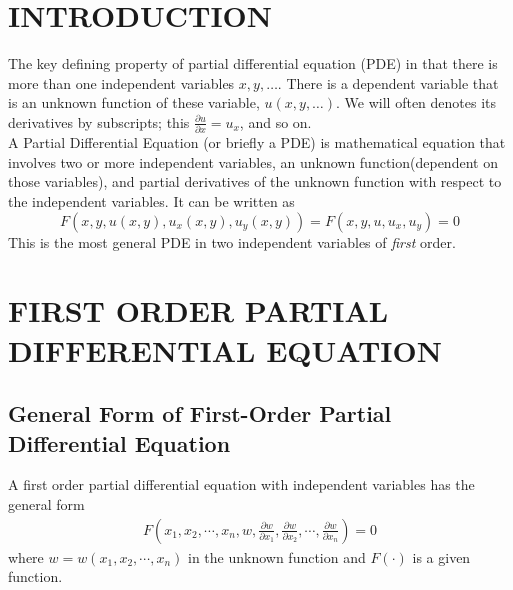 \documentclass[11pt]{report}
\newcommand{\dsp}{\displaystyle}
\begin{document}
	\section{INTRODUCTION}
	The key defining property of partial differential equation (PDE) in that there is more than one independent variables $x,y,\ldots$. There is a dependent variable that is an unknown function of these variable, $u(x,y,\ldots)$. We will often denotes its derivatives by subscripts; this $\dsp\frac{\partial u}{\partial x} = u_x$, and so on.\\
	
	A Partial Differential Equation (or briefly a PDE) is  mathematical equation that involves two or more independent variables, an unknown function(dependent on those variables), and partial derivatives of the unknown function with respect to the independent variables. It can be written as
	\begin{equation}
		F(x,y,u(x,y), u_x(x,y), u_y(x,y)) = F(x,y,u,u_x,u_y) = 0
	\end{equation}
	This is the most general PDE in two independent variables of \textit{first} order.\\	
	
	
	
	\section{FIRST ORDER PARTIAL DIFFERENTIAL EQUATION}
	\subsection{General Form of First-Order Partial Differential Equation}
	A first order partial differential equation with independent variables has the general form
	\begin{eqnarray}
		F\left(x_1,x_2,\cdots,x_n,w,\frac{\partial w}{\partial x_1},\frac{\partial w}{\partial x_2},\cdots , \frac{\partial w}{\partial x_n}\right) = 0\label{eq:3_9}
	\end{eqnarray}
	where $w=w(x_1, x_2,\cdots,x_n)$ in the unknown function and $F(\cdot)$ is a given function.
	
\end{document}
